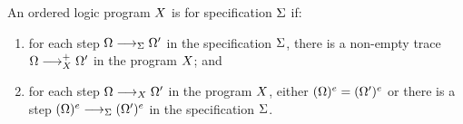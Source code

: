 \documentclass[
  class=../hdeyoung-proposal,
  crop=false
]{standalone}
\begin{document}
\begin{definition}
  An ordered logic program $X$ is  for specification $\Sigma$ if:
  \begin{enumerate}
  \item for each step $\octx \trans[\spec] \octx'$ in the specification $\Sigma$, there is a non-empty trace $\octx \trans+[\chor] \octx'$ in the program $X$; and
  \item for each step $\octx \trans[\chor] \octx'$ in the program $X$, either $(\Omega)^{e} = (\Omega')^{e}$ or there is a step $\erasemsg{(\octx)} \trans[\spec] \erasemsg{(\octx')}$ in the specification $\Sigma$.
  \end{enumerate}
\end{definition}
\end{document}
